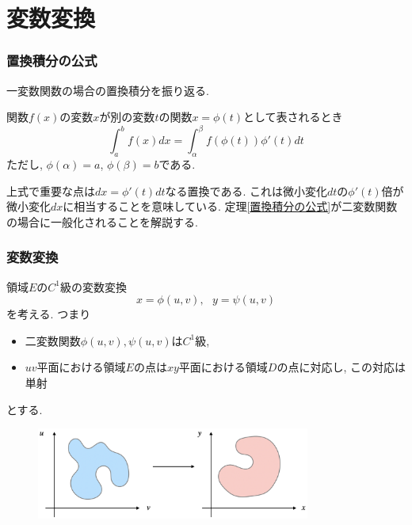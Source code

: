 


\section{変数変換}

\begin{frame}
\frametitle{置換積分の公式}

一変数関数の場合の置換積分を振り返る.

\begin{Thm}[置換積分の公式] \label{置換積分の公式}
関数$f(x)$の変数$x$が別の変数$t$の関数$x=\phi(t)$として表されるとき
$$
\int_a^b f(x)dx =\int_\alpha^\beta f(\phi(t))\phi'(t)dt
$$
ただし, $\phi(\alpha)=a$,  $\phi(\beta)=b$である. 
\end{Thm}
上式で重要な点は$dx=\phi'(t)dt$なる置換である. 
これは微小変化$dt$の$\phi'(t)$倍が微小変化$dx$に相当することを意味している. 
定理\ref{置換積分の公式}が二変数関数の場合に一般化されることを解説する. 

\end{frame}






\begin{frame}
\frametitle{変数変換}

領域$E$の$C^1$級の変数変換
$$
x=\phi(u,v), \ \ \ y=\psi(u,v)
$$
を考える. 
つまり
\begin{itemize}
\item 二変数関数$\phi(u,v), \psi(u,v)$は$C^1$級, 
\item $uv$平面における領域$E$の点は$xy$平面における領域$D$の点に対応し, この対応は単射
\end{itemize}
とする. 

\vspace{-2mm}
\begin{figure}[htbp]
 \begin{center} 
  \includegraphics[width=90mm]{calculus13/var_change0.png}
 \end{center}
\end{figure}
\vspace{-2mm}


\end{frame}


